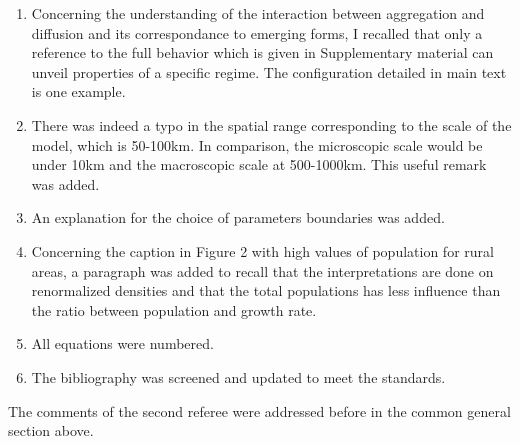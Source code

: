 \documentclass[11pt,a4paper,sans]{moderncv}        %
\begin{document}
\begin{enumerate}
	\item Concerning the understanding of the interaction between aggregation and diffusion and its correspondance to emerging forms, I recalled that only a reference to the full behavior which is given in Supplementary material can unveil properties of a specific regime. The configuration detailed in main text is one example.
	\item There was indeed a typo in the spatial range corresponding to the scale of the model, which is 50-100km. In comparison, the microscopic scale would be under 10km and the macroscopic scale at 500-1000km. This useful remark was added.
	\item An explanation for the choice of parameters boundaries was added.
	\item Concerning the caption in Figure 2 with high values of population for rural areas, a paragraph was added to recall that the interpretations are done on renormalized densities and that the total populations has less influence than the ratio between population and growth rate.
	\item All equations were numbered.
	\item The bibliography was screened and updated to meet the standards.
\end{enumerate}


The comments of the second referee were addressed before in the common general section above.
\end{document}
